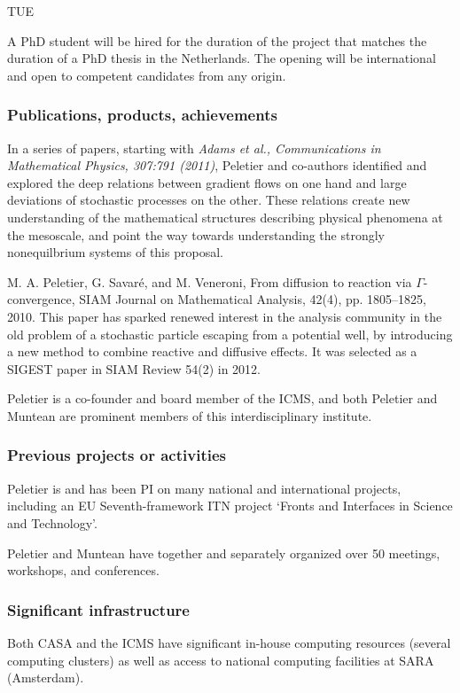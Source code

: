 \begin{sitedescription}{TUE}
\begin{participant}[type=res,PM=48]
A PhD student will be hired for the duration of the project that matches the duration of a
PhD thesis in the Netherlands. 
%
The opening will be international and open to competent candidates from any
origin.
\end{participant}


\subsubsection*{Publications, products, achievements}

\begin{compactenum}
\item {In a series of papers, starting with \emph{Adams et al., Communications in Mathematical Physics, 307:791 (2011)}, Peletier and co-authors identified and explored the deep relations between gradient flows on one hand and large deviations of stochastic processes on the other. These relations create new understanding of the mathematical structures describing physical phenomena at the mesoscale, and point the way towards understanding the strongly nonequilbrium systems of this proposal.}
\item {M. A. Peletier, G. Savar\'e, and M. Veneroni, From diffusion to reaction via $\Gamma$-convergence, SIAM Journal on Mathematical Analysis, 42(4), pp. 1805--1825, 2010.
This paper has sparked renewed interest in the analysis community in the old problem of a stochastic particle escaping from a potential well, by introducing a new method to combine reactive and diffusive effects. It was selected as a SIGEST paper in SIAM Review 54(2) in 2012.}
\item {Peletier is a co-founder and board member of the ICMS, and both Peletier and Muntean are prominent members of this interdisciplinary institute.}
\end{compactenum}

\subsubsection*{Previous projects or activities}

\begin{compactenum}
\item {Peletier is and has been PI on many national and international projects, including an EU Seventh-framework ITN project `Fronts and Interfaces in Science and Technology'.}
\item {Peletier and Muntean have together and separately organized over 50 meetings, workshops, and conferences.}
\end{compactenum}

\subsubsection*{Significant infrastructure}

{Both CASA and the ICMS have significant in-house computing resources (several computing clusters) as well as access to national computing facilities at SARA (Amsterdam).}
\end{sitedescription}

